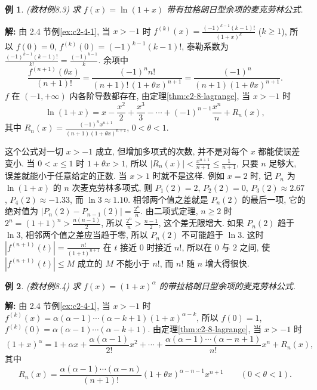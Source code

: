 \documentclass[UTF8,openany]{ctexbook}
\theoremstyle{chinesetextbook}
\newtheorem{example}{例}[section]
\newenvironment{cnsolution}{\par\indent\textbf{解:} \ignorespaces}{\par}
\begin{document}
\begin{example}\label{ex:c2-8-3}
\textnormal{(教材例8.3)} 求 $f(x)=\ln(1+x)$ 带有拉格朗日型余项的麦克劳林公式.
\end{example}
\begin{cnsolution}
由 2.4 节例\ref{ex:c2-4-1}, 当 $x>-1$ 时 $\displaystyle f^{(k)}(x)=\frac{(-1)^{k-1}(k-1)!}{(1+x)^k}$ ($k\ge1$), 所以 $f(0)=0$, $f^{(k)}(0)=(-1)^{k-1}(k-1)!$, 泰勒系数为 $\displaystyle\frac{(-1)^{k-1}(k-1)!}{k!}=\frac{(-1)^{k-1}}k$. 余项中
\[
\frac{f^{(n+1)}(\theta x)}{(n+1)!}=\frac{(-1)^nn!}{(n+1)!\,(1+\theta x)^{n+1}}=\frac{(-1)^n}{(n+1)(1+\theta x)^{n+1}}.
\]
$f$ 在 $(-1,+\infty)$ 内各阶导数都存在, 由定理\ref{thm:c2-8-lagrange}, 当 $x>-1$ 时
\[
\ln(1+x)=x-\frac{x^2}2+\frac{x^3}3-\cdots+(-1)^{n-1}\frac{x^n}n+R_n(x),
\]
其中 $\displaystyle R_n(x)=\frac{(-1)^nx^{n+1}}{(n+1)(1+\theta x)^{n+1}}$, $0<\theta<1$.
\end{cnsolution}
这个公式对一切 $x>-1$ 成立, 但增加多项式的次数, 并不是对每个 $x$ 都能使误差变小. 当 $0<x\le1$ 时 $1+\theta x>1$, 所以 $\displaystyle|R_n(x)|<\frac{x^{n+1}}{n+1}\le\frac1{n+1}$, 只要 $n$ 足够大, 误差就能小于任意给定的正数. 当 $x>1$ 时就不是这样. 例如 $x=2$ 时, 记 $P_n$ 为 $\ln(1+x)$ 的 $n$ 次麦克劳林多项式, 则 $P_1(2)=2$, $P_2(2)=0$, $P_3(2)\approx2.67$, $P_4(2)\approx-1.33$, 而 $\ln3\approx1.10$. 相邻两个值之差就是 $P_n(2)$ 的最后一项, 它的绝对值为 $\displaystyle|P_n(2)-P_{n-1}(2)|=\frac{2^n}n$. 由二项式定理, $n\ge2$ 时 $\displaystyle2^n=(1+1)^n>\frac{n(n-1)}2$, 所以 $\displaystyle\frac{2^n}n>\frac{n-1}2$, 这个差无限增大. 如果 $P_n(2)$ 趋于 $\ln3$, 相邻两个值之差应当趋于零, 所以 $P_n(2)$ 不可能趋于 $\ln3$. 这时 $\displaystyle|f^{(n+1)}(t)|=\frac{n!}{(1+t)^{n+1}}$ 在 $t$ 接近 $0$ 时接近 $n!$, 所以在 $0$ 与 $2$ 之间, 使 $|f^{(n+1)}(t)|\le M$ 成立的 $M$ 不能小于 $n!$, 而 $n!$ 随 $n$ 增大得很快.
\begin{example}\label{ex:c2-8-4}
\textnormal{(教材例8.4)} 求 $f(x)=(1+x)^\alpha$ 的带拉格朗日型余项的麦克劳林公式.
\end{example}
\begin{cnsolution}
由 2.4 节例\ref{ex:c2-4-1}, 当 $x>-1$ 时 $f^{(k)}(x)=\alpha(\alpha-1)\cdots(\alpha-k+1)(1+x)^{\alpha-k}$, 所以 $f(0)=1$, $f^{(k)}(0)=\alpha(\alpha-1)\cdots(\alpha-k+1)$. 由定理\ref{thm:c2-8-lagrange}, 当 $x>-1$ 时
\[
(1+x)^\alpha=1+\alpha x+\frac{\alpha(\alpha-1)}{2!}x^2+\cdots+\frac{\alpha(\alpha-1)\cdots(\alpha-n+1)}{n!}x^n+R_n(x),
\]
其中
\[
R_n(x)=\frac{\alpha(\alpha-1)\cdots(\alpha-n)}{(n+1)!}(1+\theta x)^{\alpha-n-1}x^{n+1}\qquad(0<\theta<1).
\]
\end{cnsolution}
\end{document}
